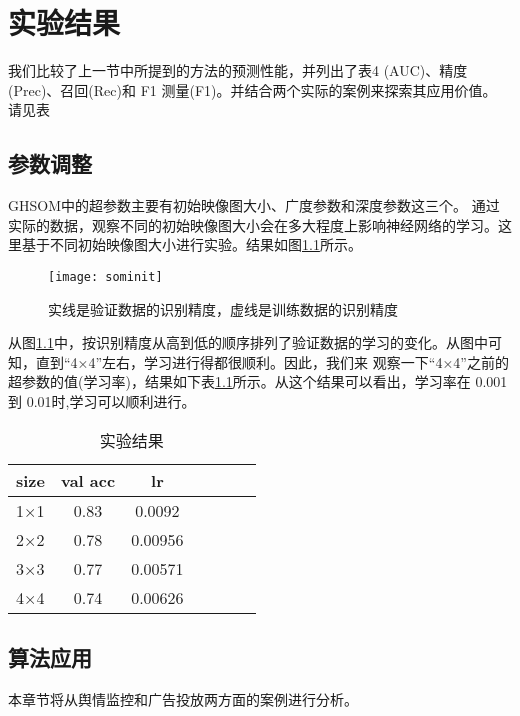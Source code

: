 
\chapter{实验结果}
\label{chap:result}

我们比较了上一节中所提到的方法的预测性能，并列出了表4 (AUC)、精度(Prec)、召回(Rec)和 F1 测量(F1)。并结合两个实际的案例来探索其应用价值。
请见表




\section{参数调整}\label{sec:anly}

GHSOM中的超参数主要有初始映像图大小、广度参数和深度参数这三个。
通过实际的数据，观察不同的初始映像图大小会在多大程度上影响神经网络的学习。这里基于不同初始映像图大小进行实验。结果如图\ref{fig:initialization}所示。

\begin{figure}[!htbp]
    \centering
    \texttt{[image: sominit]}
    \caption{实线是验证数据的识别精度，虚线是训练数据的识别精度}
    \label{fig:initialization}
\end{figure}


从图\ref{fig:initialization}中，按识别精度从高到低的顺序排列了验证数据的学习的变化。从图中可知，直到“4×4”左右，学习进行得都很顺利。因此，我们来 观察一下“4×4”之前的超参数的值(学习率)，结果如下表\ref{tab:init}所示。从这个结果可以看出，学习率在 0.001 到 0.01时,学习可以顺利进行。


\begin{table}[!htbp]
    \caption{实验结果}
    \label{tab:init}
    \centering
    \footnotesize%
    \setlength{\tabcolsep}{4pt}%
    \begin{tabular}{l*{5}{c}r}
        size       & val acc  & lr  \\
        \hline
        1×1        & 0.83     & 0.0092  \\
        2×2        & 0.78     & 0.00956 \\
        3×3        & 0.77     & 0.00571 \\
        4×4        & 0.74     & 0.00626 \\
    \end{tabular}
\end{table}

\section{算法应用}
本章节将从舆情监控和广告投放两方面的案例进行分析。

